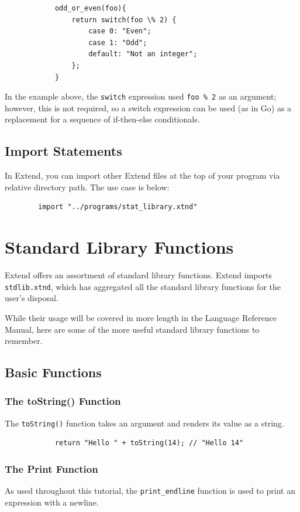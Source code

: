 		\begin{lstlisting}
			odd_or_even(foo){
				return switch(foo \% 2) {
					case 0: "Even";
					case 1: "Odd";
					default: "Not an integer";
				};
			}
		\end{lstlisting}

	\medskip \noindent
	In the example above, the \texttt{switch} expression used \texttt{foo \% 2} as an argument; however, this is not required, so a switch expression can be used (as in Go) as a replacement for a sequence of if-then-else conditionals.

	\subsection{Import Statements}
	In Extend, you can import other Extend files at the top of your program via relative directory path. The use case is below:

	\begin{lstlisting}
		import "../programs/stat_library.xtnd"
	\end{lstlisting}


\section{Standard Library Functions}
Extend offers an assortment of standard library functions. Extend imports \texttt{stdlib.xtnd}, which has aggregated all the standard library functions for the user's disposal.

\medskip \noindent
While their usage will be covered in more length in the Language Reference Manual, here are some of the more useful standard library functions to remember.
	\subsection{Basic Functions}
		\subsubsection{The toString() Function}
		The \texttt{toString()} function takes an argument and renders its value as a string.

		\begin{lstlisting}
			return "Hello " + toString(14); // "Hello 14"
		\end{lstlisting}

		\subsubsection{The Print Function}
		As used throughout this tutorial, the \texttt{print\_endline} function is used to print an expression with a newline.

